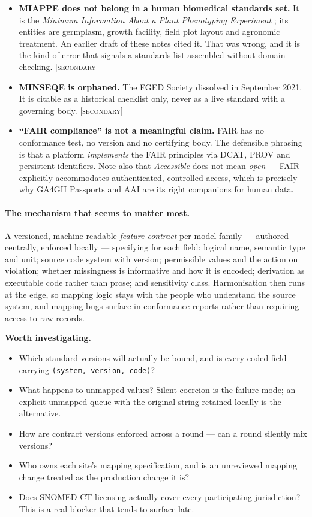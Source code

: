\documentclass[11pt,a4paper]{article}
\newcommand{\flag}[1]{\textcolor{flagcolor}{\textbf{#1}}}
\newcommand{\secondary}{\textsc{[secondary]}}
\newcommand{\investigate}{\par\smallskip\noindent\textbf{Worth investigating.}}
\begin{document}
\begin{itemize}
  \item \flag{MIAPPE does not belong in a human biomedical standards set.}
  It is the \emph{Minimum Information About a Plant Phenotyping Experiment}
  \citep{miappe}; its entities are germplasm, growth facility, field plot
  layout and agronomic treatment. An earlier draft of these notes cited it.
  That was wrong, and it is the kind of error that signals a standards list
  assembled without domain checking. \secondary

  \item \flag{MINSEQE is orphaned.} The FGED Society dissolved in September
  2021. It is citable as a historical checklist only, never as a live
  standard with a governing body. \secondary

  \item \flag{``FAIR compliance'' is not a meaningful claim.} FAIR
  \citep{wilkinson2016fair} has no conformance test, no version and no
  certifying body. The defensible phrasing is that a platform
  \emph{implements} the FAIR principles via DCAT, PROV and persistent
  identifiers. Note also that \emph{Accessible} does not mean \emph{open}
  --- FAIR explicitly accommodates authenticated, controlled access, which
  is precisely why GA4GH Passports and AAI are its right companions for
  human data.
\end{itemize}

\paragraph{The mechanism that seems to matter most.} A versioned,
machine-readable \emph{feature contract} per model family --- authored
centrally, enforced locally --- specifying for each field: logical name,
semantic type and unit; source code system with version; permissible values
and the action on violation; whether missingness is informative and how it
is encoded; derivation as executable code rather than prose; and
sensitivity class. Harmonisation then runs at the edge, so mapping logic
stays with the people who understand the source system, and mapping bugs
surface in conformance reports rather than requiring access to raw records.

\investigate
\begin{itemize}
  \item Which standard versions will actually be bound, and is every coded
  field carrying \texttt{(system, version, code)}?
  \item What happens to unmapped values? Silent coercion is the failure
  mode; an explicit unmapped queue with the original string retained
  locally is the alternative.
  \item How are contract versions enforced across a round --- can a round
  silently mix versions?
  \item Who owns each site's mapping specification, and is an unreviewed
  mapping change treated as the production change it is?
  \item Does SNOMED CT licensing actually cover every participating
  jurisdiction? This is a real blocker that tends to surface late.
\end{itemize}
\end{document}
